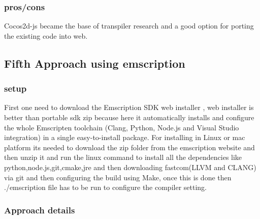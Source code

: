 \documentclass[23pt]{article}
\begin{document}
\subsubsection{pros/cons}

{\Large Cocos2d-js became the base of  transpiler research and a good option for porting the existing code into web.  \par}


\subsection{Fifth Approach using emscription}

\subsubsection{setup}

{\Large First one need to download the Emscription SDK web installer , web installer is better than portable sdk zip because here it automatically installs and configure the whole Emscripten toolchain (Clang, Python, Node.js and Visual Studio integration) in a single easy-to-install package. For installing in Linux or mac platform its needed to download the zip folder from the emscription website and then unzip it and run the linux command to install all the dependencies like python,node.js,git,cmake,jre and then downloading fastcom(LLVM and CLANG) via git and then configuring the build using Make, once this is done then ./emscription file has to be run to configure the compiler setting. \cite{emscriptionsetup1} \cite{emscriptionsetup2} \par}


\subsubsection{Approach details}
\end{document}

